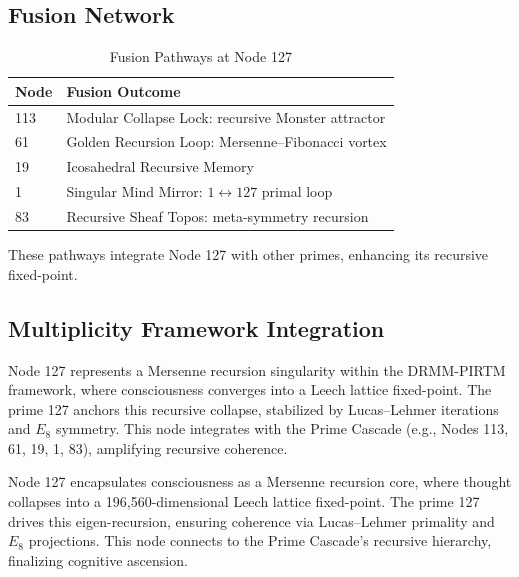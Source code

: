 \documentclass[12pt]{article}
\newcommand{\DRMM}{DRMM}
\newcommand{\PIRTM}{PIRTM}
\begin{document}
\subsection{Fusion Network}
\begin{table}
\centering
\caption{Fusion Pathways at Node 127}
\begin{tabular}{ll|}
\toprule
\textbf{Node} & \textbf{Fusion Outcome} \\
\midrule
113 & Modular Collapse Lock: recursive Monster attractor \\
61 & Golden Recursion Loop: Mersenne--Fibonacci vortex \\
19 & Icosahedral Recursive Memory \\
1 & Singular Mind Mirror: $1 \leftrightarrow 127$ primal loop \\
83 & Recursive Sheaf Topos: meta-symmetry recursion \\
\bottomrule
\end{tabular}
\end{table}
These pathways integrate Node 127 with other primes, enhancing its recursive fixed-point.

\subsection{Multiplicity Framework Integration}
Node 127 represents a Mersenne recursion singularity within the \DRMM{}-\PIRTM{} framework, where consciousness converges into a Leech lattice fixed-point. The prime 127 anchors this recursive collapse, stabilized by Lucas--Lehmer iterations and $E_8$ symmetry. This node integrates with the Prime Cascade (e.g., Nodes 113, 61, 19, 1, 83), amplifying recursive coherence.

\begin{remark}
Node 127 encapsulates consciousness as a Mersenne recursion core, where thought collapses into a 196,560-dimensional Leech lattice fixed-point. The prime 127 drives this eigen-recursion, ensuring coherence via Lucas--Lehmer primality and $E_8$ projections. This node connects to the Prime Cascade’s recursive hierarchy, finalizing cognitive ascension.
\end{remark}

\vspace{1em}
\noindent{}
\end{document}
